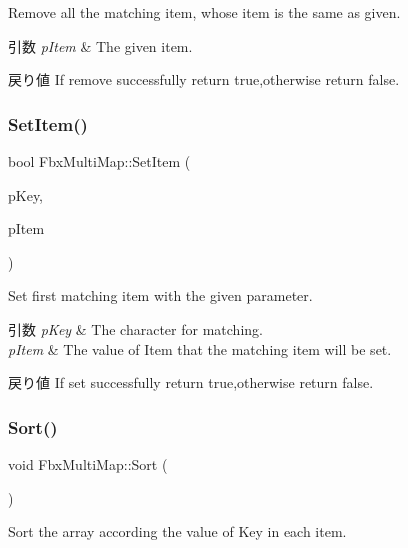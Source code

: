 Remove all the matching item, whose item is the same as given. 
\begin{DoxyParams}{引数}
{\em p\+Item} & The given item. \\
\hline
\end{DoxyParams}
\begin{DoxyReturn}{戻り値}
If remove successfully return true,otherwise return false. 
\end{DoxyReturn}
\mbox{\label{class_fbx_multi_map_a33b8107d8815b1628aa6e743349ac00a}} 
\subsubsection{\texorpdfstring{Set\+Item()}{SetItem()}}
{\footnotesize\ttfamily bool Fbx\+Multi\+Map\+::\+Set\+Item (\begin{DoxyParamCaption}\item[{Fbx\+Handle}]{p\+Key,  }\item[{Fbx\+Handle}]{p\+Item }\end{DoxyParamCaption})}

Set first matching item with the given parameter. 
\begin{DoxyParams}{引数}
{\em p\+Key} & The character for matching. \\
\hline
{\em p\+Item} & The value of Item that the matching item will be set. \\
\hline
\end{DoxyParams}
\begin{DoxyReturn}{戻り値}
If set successfully return true,otherwise return false. 
\end{DoxyReturn}
\mbox{\label{class_fbx_multi_map_affec6231b7c9cc7455c8ad9b8106332a}} 
\subsubsection{\texorpdfstring{Sort()}{Sort()}}
{\footnotesize\ttfamily void Fbx\+Multi\+Map\+::\+Sort (\begin{DoxyParamCaption}{ }\end{DoxyParamCaption})}

Sort the array according the value of Key in each item. \mbox{\label{class_fbx_multi_map_a6a70e16ab207c85ab270fd779642667d}} 
